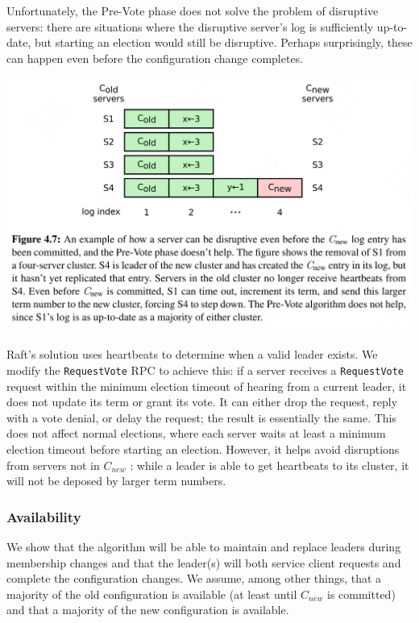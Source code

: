 \documentclass[11pt]{article}
\begin{document}
Unfortunately, the Pre-Vote phase does not solve the problem of disruptive servers: there are
situations where the disruptive server’s log is sufficiently up-to-date, but starting an election
would still be disruptive. Perhaps surprisingly, these can happen even before the configuration change
completes.

\begin{center}
\includegraphics[width=.99\textwidth]{../../images/papers/20.png}
\label{}
\end{center}


Raft’s solution uses heartbeats to determine when a valid leader exists. We modify the \texttt{RequestVote} RPC
to achieve this: if a server receives a \texttt{RequestVote} request within the minimum election timeout of
hearing from a current leader, it does not update its term or grant its vote. It can either drop the
request, reply with a vote denial, or delay the request; the result is essentially the same. This does
not affect normal elections, where each server waits at least a minimum election timeout before
starting an election. However, it helps avoid disruptions from servers not in \(C_{new}\) : while a leader is
able to get heartbeats to its cluster, it will not be deposed by larger term numbers. \label{Problem1}
\subsubsection{Availability}
\label{sec:orgcd9ce06}
\label{Problem2}
We show that the algorithm will be able to maintain and replace leaders during membership changes and
that the leader(s) will both service client requests and complete the configuration changes. We
assume, among other things, that a majority of the old configuration is available (at least until \(C_{new}\)
is committed) and that a majority of the new configuration is available.
\end{document}
